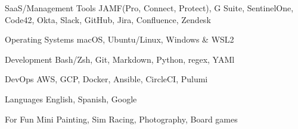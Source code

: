 

\begin{cvskills}


	\cvskill
	{SaaS/Management Tools} %
	{JAMF(Pro, Connect, Protect), G Suite, SentinelOne, Code42, Okta, Slack, GitHub, Jira, Confluence, Zendesk} %

	\cvskill
	{Operating Systems} %
	{macOS, Ubuntu/Linux, Windows \& WSL2} %

	\cvskill
	{Development} %
	{Bash/Zsh, Git, Markdown, Python, regex, YAMl} %

	\cvskill
	{DevOps} %
	{AWS, GCP, Docker, Ansible, CircleCI, Pulumi} %

	\cvskill
	{Languages} %
	{English, Spanish, Google} %

	\cvskill
	{For Fun}
	{Mini Painting, Sim Racing, Photography, Board games}

\end{cvskills}
